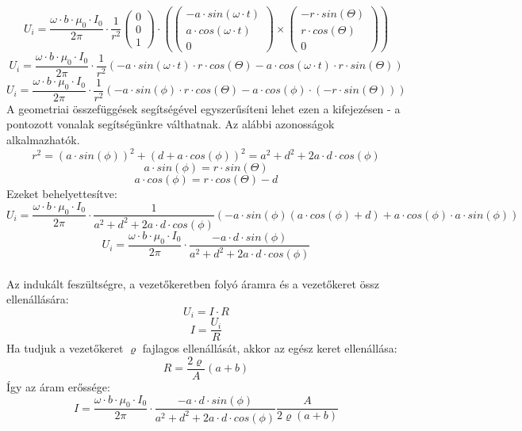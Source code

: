 \documentclass[11pt,a4paper,openany,leqno]{article}
\begin{document}
$$ U_i = \frac{\omega \cdot b \cdot\mu_0\cdot I_0}{2\pi}\cdot \frac{1}{r^2}\begin{pmatrix} 0 \\ 0 \\ 1 \end{pmatrix} \cdot ( \begin{pmatrix} - a \cdot sin(\omega\cdot t) \\ a \cdot cos(\omega \cdot t) \\0\end{pmatrix} \times \begin{pmatrix} - r \cdot sin(\Theta) \\ r \cdot cos(\Theta) \\ 0\end{pmatrix} ) $$
$$ U_i = \frac{\omega \cdot b \cdot\mu_0\cdot I_0}{2\pi}\cdot \frac{1}{r^2} (- a \cdot sin(\omega\cdot t) \cdot r \cdot cos(\Theta) - a \cdot cos(\omega \cdot t) \cdot r \cdot sin(\Theta)) $$
 $$ U_i = \frac{\omega \cdot b \cdot\mu_0\cdot I_0}{2\pi}\cdot \frac{1}{r^2} (- a \cdot sin(\phi) \cdot r \cdot cos(\Theta)- a \cdot cos(\phi) \cdot (-r \cdot sin(\Theta))) $$\indent
A geometriai összefüggések segítségével egyszerűsíteni lehet ezen a kifejezésen - a pontozott vonalak segítségünkre válthatnak. Az alábbi azonosságok alkalmazhatók.\\
$$ r^2 = (a \cdot sin(\phi))^2 + (d+a\cdot cos(\phi))^2 = a^2 + d^2 + 2a\cdot d \cdot cos(\phi)$$
$$ a \cdot sin(\phi) = r \cdot sin(\Theta) $$ 
$$ a \cdot cos(\phi) = r \cdot cos(\Theta) - d $$\indent
Ezeket behelyettesítve:\\
$$ U_i = \frac{\omega \cdot b \cdot\mu_0\cdot I_0}{2\pi}\cdot \frac{1}{a^2 + d^2 + 2a\cdot d \cdot cos(\phi)} (- a \cdot sin(\phi) (a \cdot cos(\phi) +d) + a \cdot cos(\phi) \cdot a \cdot sin(\phi)) $$
 $$ U_i = \frac{\omega \cdot b \cdot\mu_0\cdot I_0}{2\pi}\cdot \frac{-a\cdot d \cdot sin(\phi)}{a^2 + d^2 + 2a\cdot d \cdot cos(\phi)} $$\\ \indent
Az indukált feszültségre, a vezetőkeretben folyó áramra és a vezetőkeret össz ellenállására:\\
$$ U_i = I \cdot R $$
$$ I = \frac{U_i}{R} $$\indent
Ha tudjuk a vezetőkeret $\varrho$ fajlagos ellenállását, akkor az egész keret ellenállása:\\
$$ R = \frac{2 \varrho}{A}(a+b) $$\indent
Így az áram erőssége:\\
$$ I = \frac{\omega \cdot b \cdot\mu_0\cdot I_0}{2\pi}\cdot \frac{-a\cdot d \cdot sin(\phi)}{a^2 + d^2 + 2a\cdot d \cdot cos(\phi)}\frac{A}{2 \varrho (a+b)} $$
\end{document}
